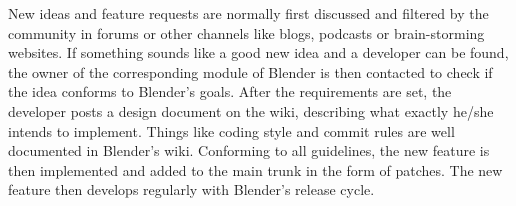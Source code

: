 New ideas and feature requests are normally first discussed and filtered by the community in forums or other channels like blogs, podcasts or brain-storming websites.\cite{blender-community} 
If something sounds like a good new idea and a developer can be found, the owner of the corresponding module of Blender is then contacted to check if the idea conforms to Blender's goals. 
After the requirements are set, the developer posts a design document on the wiki, describing what exactly he/she intends to implement.\cite{blender-new-devs}
Things like coding style\cite{blender-style-rules} and commit rules\cite{blender-new-devs} are well documented in Blender's wiki. 
Conforming to all guidelines, the new feature is then implemented and added to the main trunk in the form of patches. 
The new feature then develops regularly with Blender's release cycle.

